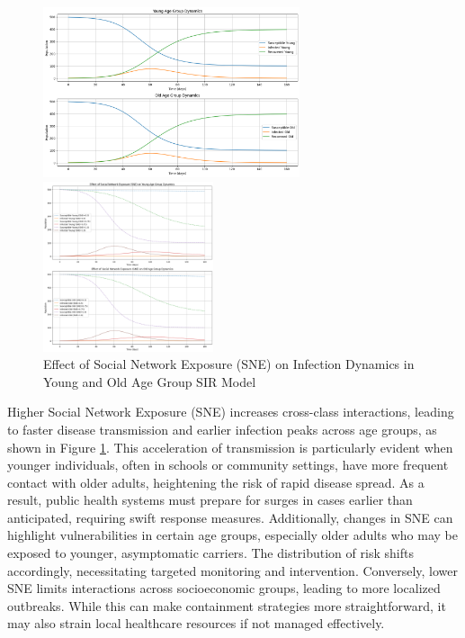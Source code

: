 \documentclass[9 pt]{article} %
\begin{document}
\begin{figure}[h]
    \centering
    \begin{minipage}[t]{0.45\textwidth}
        \centering
        \includegraphics[height=5cm]{Figures/age-wise_SNE_1.png}
        \caption{SIR Model with Young and Old Age Group Dynamics with Social Network Exposure (SNE) =1}
        \label{analysis_2_sne_1}
    \end{minipage}
    \hspace{0.05\textwidth}
    \begin{minipage}[t]{0.45\textwidth}
        \centering
        \includegraphics[height=5cm]{Figures/agewise_change_SNE.png}
        \caption{Effect of Social Network Exposure (SNE) on Infection Dynamics in Young and Old Age Group SIR Model}
        \label{analysis_2_sne_change}
    \end{minipage}
\end{figure}

Higher Social Network Exposure (SNE) increases cross-class interactions, leading to faster disease transmission and earlier infection peaks across age groups, as shown in Figure \ref{analysis_2_sne_change}. This acceleration of transmission is particularly evident when younger individuals, often in schools or community settings, have more frequent contact with older adults, heightening the risk of rapid disease spread. As a result, public health systems must prepare for surges in cases earlier than anticipated, requiring swift response measures. Additionally, changes in SNE can highlight vulnerabilities in certain age groups, especially older adults who may be exposed to younger, asymptomatic carriers. The distribution of risk shifts accordingly, necessitating targeted monitoring and intervention. Conversely, lower SNE limits interactions across socioeconomic groups, leading to more localized outbreaks. While this can make containment strategies more straightforward, it may also strain local healthcare resources if not managed effectively.
\end{document}
